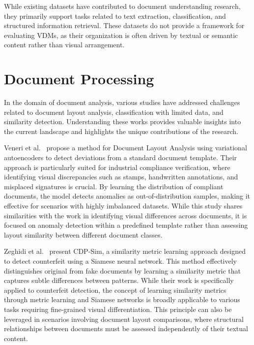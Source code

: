 While existing datasets have contributed to document understanding research, they primarily support tasks related to text extraction, classification, and structured information retrieval. These datasets do not provide a framework for evaluating \glspl{VDM}, as their organization is often driven by textual or semantic content rather than visual arrangement.

\section{Document Processing}

In the domain of document analysis, various studies have addressed challenges related to document layout analysis, classification with limited data, and similarity detection. Understanding these works provides valuable insights into the current landscape and highlights the unique contributions of the research.

Veneri et al.~\cite{youssef_document_2022} propose a method for Document Layout Analysis using variational autoencoders to detect deviations from a standard document template. Their approach is particularly suited for industrial compliance verification, where identifying visual discrepancies such as stamps, handwritten annotations, and misplaced signatures is crucial. By learning the distribution of compliant documents, the model detects anomalies as out-of-distribution samples, making it effective for scenarios with highly imbalanced datasets. While this study shares similarities with the work in identifying visual differences across documents, it is focused on anomaly detection within a predefined template rather than assessing layout similarity between different document classes.%

Zeghidi et al.~\cite{zeghidi_cdp-sim_2023} present CDP-Sim, a similarity metric learning approach designed to detect counterfeit using a Siamese neural network. This method effectively distinguishes original from fake documents by learning a similarity metric that captures subtle differences between patterns. While their work is specifically applied to counterfeit detection, the concept of learning similarity metrics through metric learning and Siamese networks is broadly applicable to various tasks requiring fine-grained visual differentiation. This principle can also be leveraged in scenarios involving document layout comparisons, where structural relationships between documents must be assessed independently of their textual content.

